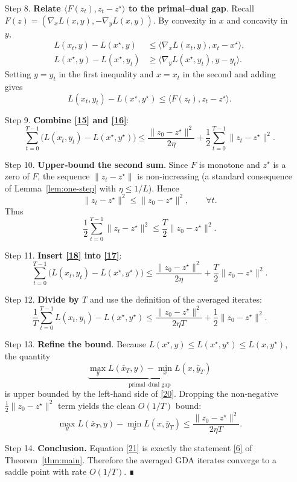 \documentclass{article}
\begin{document}
\begin{enumerate}
\item[Step 8.] \textbf{Relate $\langle F(z_{t}),z_{t}-z^{\star}\rangle$ to the primal–dual gap}.
Recall $F(z)=(\nabla_{x}L(x,y),-\nabla_{y}L(x,y))$. By convexity in $x$ and concavity in $y$,
\[
\begin{aligned}
L(x_{t},y)-L(x^{\star},y)
&\le \langle\nabla_{x}L(x_{t},y),x_{t}-x^{\star}\rangle,
\\
L(x^{\star},y)-L(x^{\star},y_{t})
&\ge \langle\nabla_{y}L(x^{\star},y_{t}),y-y_{t}\rangle .
\end{aligned}
\]
Setting $y=y_{t}$ in the first inequality and $x=x_{t}$ in the second and adding gives
\[
L(x_{t},y_{t})-L(x^{\star},y^{\star})
\le
\langle F(z_{t}),z_{t}-z^{\star}\rangle .
\tag{16}
\]

\item[Step 9.] \textbf{Combine \eqref{15} and \eqref{16}}:
\[
\sum_{t=0}^{T-1}\bigl(L(x_{t},y_{t})-L(x^{\star},y^{\star})\bigr)
\le
\frac{\|z_{0}-z^{\star}\|^{2}}{2\eta}
+\frac{1}{2}\sum_{t=0}^{T-1}\|z_{t}-z^{\star}\|^{2}.
\tag{17}
\]

\item[Step 10.] \textbf{Upper‑bound the second sum}.
Since $F$ is monotone and $z^{\star}$ is a zero of $F$, the sequence $\|z_{t}-z^{\star}\|$ is
non‑increasing (a standard consequence of Lemma~\ref{lem:one-step} with $\eta\le1/L$). Hence
\[
\|z_{t}-z^{\star}\|^{2}\le\|z_{0}-z^{\star}\|^{2},\qquad\forall t.
\]
Thus
\[
\frac{1}{2}\sum_{t=0}^{T-1}\|z_{t}-z^{\star}\|^{2}
\le
\frac{T}{2}\|z_{0}-z^{\star}\|^{2}.
\tag{18}
\]

\item[Step 11.] \textbf{Insert \eqref{18} into \eqref{17}}:
\[
\sum_{t=0}^{T-1}\bigl(L(x_{t},y_{t})-L(x^{\star},y^{\star})\bigr)
\le
\frac{\|z_{0}-z^{\star}\|^{2}}{2\eta}
+\frac{T}{2}\|z_{0}-z^{\star}\|^{2}.
\tag{19}
\]

\item[Step 12.] \textbf{Divide by $T$} and use the definition of the averaged iterates:
\[
\frac{1}{T}\sum_{t=0}^{T-1}L(x_{t},y_{t})-L(x^{\star},y^{\star})
\le
\frac{\|z_{0}-z^{\star}\|^{2}}{2\eta T}
+\frac{1}{2}\|z_{0}-z^{\star}\|^{2}.
\tag{20}
\]

\item[Step 13.] \textbf{Refine the bound}.
Because $L(x^{\star},y)\le L(x^{\star},y^{\star})\le L(x,y^{\star})$, the quantity
\[
\underbrace{\max_{y}L(\bar x_{T},y)-\min_{x}L(x,\bar y_{T})}_{\text{primal–dual gap}}
\]
is upper bounded by the left‑hand side of \eqref{20}. Dropping the non‑negative
$\frac{1}{2}\|z_{0}-z^{\star}\|^{2}$ term yields the clean $O(1/T)$ bound:
\[
\max_{y}L(\bar x_{T},y)-\min_{x}L(x,\bar y_{T})
\le
\frac{\|z_{0}-z^{\star}\|^{2}}{2\eta T}.
\tag{21}
\]

\item[Step 14.] \textbf{Conclusion.}
Equation \eqref{21} is exactly the statement \eqref{6} of Theorem~\ref{thm:main}.
Therefore the averaged GDA iterates converge to a saddle point with rate $O(1/T)$.
∎
\end{enumerate}
\end{document}
